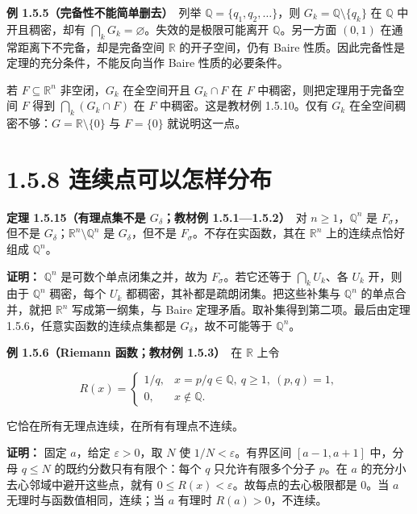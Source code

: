 \documentclass[11pt,a4paper]{article}
\begin{document}
\textbf{例 1.5.5（完备性不能简单删去）}　列举
\(\mathbb Q=\{q_1,q_2,\ldots\}\)，则 \(G_k=\mathbb Q\setminus\{q_k\}\)
在 \(\mathbb Q\) 中开且稠密，却有
\(\bigcap_kG_k=\varnothing\)。失效的是极限可能离开
\(\mathbb Q\)。另一方面 \((0,1)\) 在通常距离下不完备，却是完备空间
\(\mathbb R\) 的开子空间，仍有 Baire
性质。因此完备性是定理的充分条件，不能反向当作 Baire 性质的必要条件。

若 \(F\subseteq\mathbb R^n\) 非空闭，\(G_k\) 在全空间开且 \(G_k\cap F\)
在 \(F\) 中稠密，则把定理用于完备空间 \(F\) 得到
\(\bigcap_k(G_k\cap F)\) 在 \(F\) 中稠密。这是教材例 1.5.10。仅有
\(G_k\) 在全空间稠密不够：\(G=\mathbb R\setminus\{0\}\) 与 \(F=\{0\}\)
就说明这一点。

\section[\S{}1.5.8
连续点可以怎样分布]{1.5.8
连续点可以怎样分布}\label{ux8fdeux7eedux70b9ux53efux4ee5ux600eux6837ux5206ux5e03}

\textbf{定理 1.5.15（有理点集不是 \texorpdfstring{$G_\delta$}{Gδ}；教材例 1.5.1---1.5.2）}　对
\(n\ge1\)，\(\mathbb Q^n\) 是 \(F_\sigma\)，但不是
\(G_\delta\)；\(\mathbb R^n\setminus\mathbb Q^n\) 是
\(G_\delta\)，但不是 \(F_\sigma\)。不存在实函数，其在 \(\mathbb R^n\)
上的连续点恰好组成 \(\mathbb Q^n\)。

\textbf{证明：} \(\mathbb Q^n\) 是可数个单点闭集之并，故为
\(F_\sigma\)。若它还等于 \(\bigcap_kU_k\)、各 \(U_k\) 开，则由于
\(\mathbb Q^n\) 稠密，每个 \(U_k\)
都稠密，其补都是疏朗闭集。把这些补集与 \(\mathbb Q^n\) 的单点合并，就把
\(\mathbb R^n\) 写成第一纲集，与 Baire
定理矛盾。取补集得到第二项。最后由定理 1.5.6，任意实函数的连续点集都是
\(G_\delta\)，故不可能等于 \(\mathbb Q^n\)。

\textbf{例 1.5.6（Riemann 函数；教材例 1.5.3）}　在 \(\mathbb R\) 上令

\begin{equation*}
R(x)=\begin{cases}
1/q,&x=p/q\in\mathbb Q,\ q\ge1,\ (p,q)=1,\\
0,&x\notin\mathbb Q.
\end{cases}\tag{1.5.13}
\end{equation*}

它恰在所有无理点连续，在所有有理点不连续。

\textbf{证明：} 固定 \(a\)，给定 \(\varepsilon>0\)，取 \(N\) 使
\(1/N<\varepsilon\)。有界区间 \([a-1,a+1]\) 中，分母 \(q\le N\)
的既约分数只有有限个：每个 \(q\) 只允许有限多个分子 \(p\)。在 \(a\)
的充分小去心邻域中避开这些点，就有
\(0\le R(x)<\varepsilon\)。故每点的去心极限都是 \(0\)。当 \(a\)
无理时与函数值相同，连续；当 \(a\) 有理时 \(R(a)>0\)，不连续。
\end{document}
